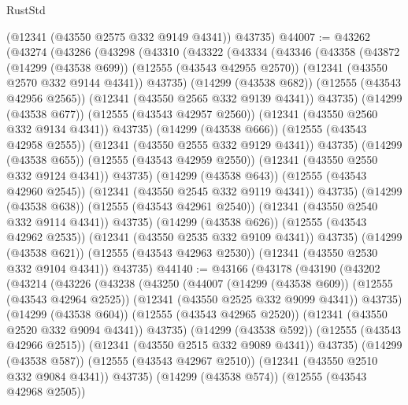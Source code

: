 \begin{lexlean}{RustStd}
\begin{coremodule}
      (@12341 (@43550 @2575 @332 @9149 @4341))
      @43735)
@44007 := @43262
    (@43274
      (@43286
        (@43298
          (@43310
            (@43322
              (@43334
                (@43346
                  (@43358
                    (@43872
                      (@14299 (@43538 @699))
                      (@12555 (@43543 @42955 @2570))
                      (@12341 (@43550 @2570 @332 @9144 @4341))
                      @43735)
                    (@14299 (@43538 @682))
                    (@12555 (@43543 @42956 @2565))
                    (@12341 (@43550 @2565 @332 @9139 @4341))
                    @43735)
                  (@14299 (@43538 @677))
                  (@12555 (@43543 @42957 @2560))
                  (@12341 (@43550 @2560 @332 @9134 @4341))
                  @43735)
                (@14299 (@43538 @666))
                (@12555 (@43543 @42958 @2555))
                (@12341 (@43550 @2555 @332 @9129 @4341))
                @43735)
              (@14299 (@43538 @655))
              (@12555 (@43543 @42959 @2550))
              (@12341 (@43550 @2550 @332 @9124 @4341))
              @43735)
            (@14299 (@43538 @643))
            (@12555 (@43543 @42960 @2545))
            (@12341 (@43550 @2545 @332 @9119 @4341))
            @43735)
          (@14299 (@43538 @638))
          (@12555 (@43543 @42961 @2540))
          (@12341 (@43550 @2540 @332 @9114 @4341))
          @43735)
        (@14299 (@43538 @626))
        (@12555 (@43543 @42962 @2535))
        (@12341 (@43550 @2535 @332 @9109 @4341))
        @43735)
      (@14299 (@43538 @621))
      (@12555 (@43543 @42963 @2530))
      (@12341 (@43550 @2530 @332 @9104 @4341))
      @43735)
@44140 := @43166
    (@43178
      (@43190
        (@43202
          (@43214
            (@43226
              (@43238
                (@43250
                  (@44007
                    (@14299 (@43538 @609))
                    (@12555 (@43543 @42964 @2525))
                    (@12341 (@43550 @2525 @332 @9099 @4341))
                    @43735)
                  (@14299 (@43538 @604))
                  (@12555 (@43543 @42965 @2520))
                  (@12341 (@43550 @2520 @332 @9094 @4341))
                  @43735)
                (@14299 (@43538 @592))
                (@12555 (@43543 @42966 @2515))
                (@12341 (@43550 @2515 @332 @9089 @4341))
                @43735)
              (@14299 (@43538 @587))
              (@12555 (@43543 @42967 @2510))
              (@12341 (@43550 @2510 @332 @9084 @4341))
              @43735)
            (@14299 (@43538 @574))
            (@12555 (@43543 @42968 @2505))

\end{coremodule}
\end{lexlean}

